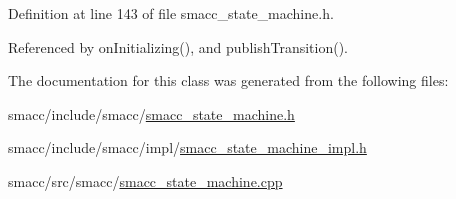 Definition at line 143 of file smacc\+\_\+state\+\_\+machine.\+h.



Referenced by on\+Initializing(), and publish\+Transition().



The documentation for this class was generated from the following files\+:\begin{DoxyCompactItemize}
\item 
smacc/include/smacc/\hyperlink{smacc__state__machine_8h}{smacc\+\_\+state\+\_\+machine.\+h}\item 
smacc/include/smacc/impl/\hyperlink{smacc__state__machine__impl_8h}{smacc\+\_\+state\+\_\+machine\+\_\+impl.\+h}\item 
smacc/src/smacc/\hyperlink{smacc__state__machine_8cpp}{smacc\+\_\+state\+\_\+machine.\+cpp}\end{DoxyCompactItemize}
